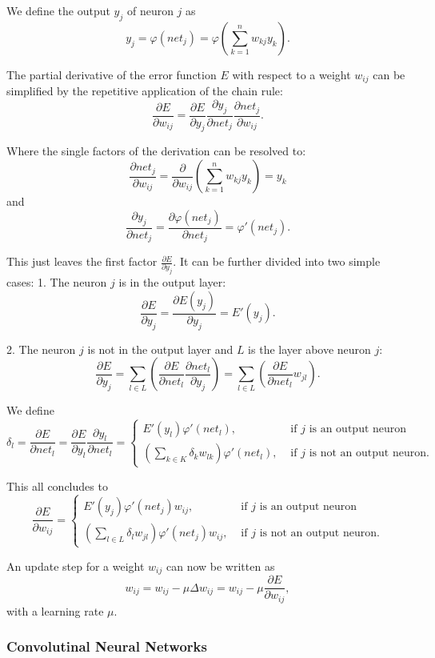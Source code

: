We define the output $y_j$ of neuron $j$ as
\[
	y_j = \varphi(net_j) = \varphi(\sum_{k=1}^n w_{kj} y_k) .
\]
 
The partial derivative of the error function $E$ with respect to a weight $w_{ij}$ can be simplified by the repetitive application of the chain rule:
\[
	\frac{\partial E}{\partial w_{ij}} = \frac{\partial E}{\partial y_j} \frac{\partial y_j}{\partial net_j} \frac{\partial net_j}{\partial w_{ij}} .
\]
 
Where the single factors of the derivation can be resolved to:
\[
	\frac{\partial net_j}{\partial w_{ij}} = \frac{\partial}{\partial w_{ij}} ( \sum_{k=1}^n w_{kj} y_k ) = y_k
\]
and 
\[
	\frac{\partial y_j}{\partial net_j} =  \frac{\partial \varphi(net_j)}{\partial net_j} = \varphi'(net_j).
\]


This just leaves the first factor $\frac{\partial E}{\partial y_j}$. It can be further divided into two simple cases:
1. The neuron $j$ is in the output layer:
\[
\frac{\partial E}{\partial y_j} = \frac{\partial E(y_j)}{\partial y_j} = E'(y_j).
\] 

2. The neuron $j$ is not in the output layer and $L$ is the layer above neuron $j$:
\[
\frac{\partial E}{\partial y_j} = \sum_{l \in L}( \frac{\partial E}{\partial net_l} \frac{\partial net_l}{\partial y_j} )  = \sum_{l \in L}( \frac{\partial E}{\partial net_l} w_{jl} ).
\] 

We define 
\[
\delta_l = \frac{\partial E}{\partial net_l} = \frac{\partial E}{\partial y_l} \frac{\partial y_l}{\partial net_l} =
\begin{cases}
E'(y_l) \varphi'(net_l), & \text{  if } j \text{ is an output neuron} \\
(\sum_{k \in K} \delta_k w_{lk}) \varphi'(net_l), & \text{  if } j \text{ is not an output neuron.}
\end{cases}
\]

This all concludes to 
\[
\frac{\partial E}{\partial w_{ij}} = 
\begin{cases}
E'(y_j) \varphi'(net_j) w_{ij}, & \text{  if } j \text{ is an output neuron} \\
(\sum_{l \in L} \delta_l w_{jl}) \varphi'(net_j) w_{ij}, & \text{  if } j \text{ is not an output neuron.}
\end{cases}
\]

An update step for a weight $w_{ij}$ can now be written as
\[
w_{ij} = w_{ij} - \mu \Delta w_{ij} = w_{ij} - \mu \frac{\partial E}{\partial w_{ij}},
\]
with a learning rate $\mu$.

\subsubsection{Convolutinal Neural Networks}

